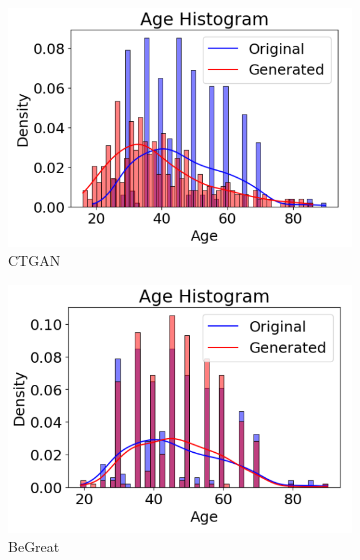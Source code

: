 \begin{figure}[H]
    \centering
    \begin{subfigure}[b]{0.45\textwidth}
        \centering
        \includegraphics[width=\textwidth]{images/age_ctgan.png}
        \caption{CTGAN}
        \label{fig:age_ctgan}
    \end{subfigure}
    \hfill
    \begin{subfigure}[b]{0.45\textwidth}
        \centering
        \includegraphics[width=\textwidth]{images/age_begreat.png}
        \caption{BeGreat}
        \label{fig:age_begreat}
    \end{subfigure}
    \hfill
    \begin{subfigure}[b]{0.45\textwidth}
        \centering

\end{subfigure}
\end{figure}
